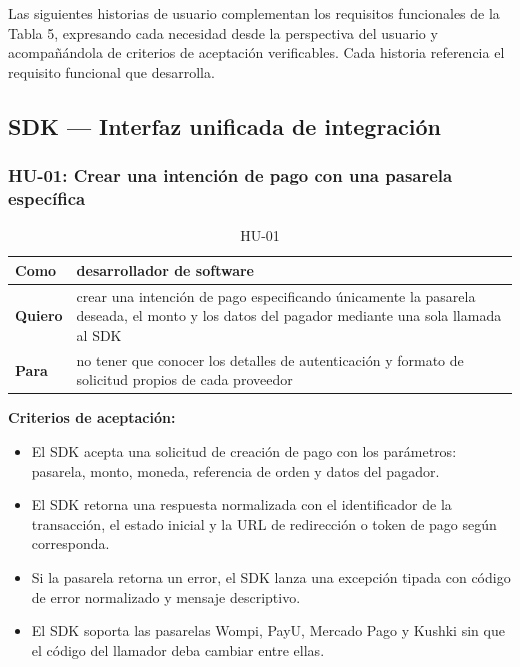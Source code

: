 \documentclass[10pt]{article}
\begin{document}
Las siguientes historias de usuario complementan los requisitos funcionales de la Tabla 5, expresando cada necesidad desde la perspectiva del usuario y acompañándola de criterios de aceptación verificables. Cada historia referencia el requisito funcional que desarrolla.

\subsection{SDK — Interfaz unificada de integración}

\subsubsection{HU-01: Crear una intención de pago con una pasarela específica}
\begin{table}[htbp]
  \centering
  \renewcommand{\arraystretch}{1.2}
  \begin{tabularx}{\textwidth}{|l|X|}
    \hline
    \textbf{Como} & desarrollador de software \\
    \hline
    \textbf{Quiero} & crear una intención de pago especificando únicamente la pasarela deseada, el monto y los datos del pagador mediante una sola llamada al SDK \\
    \hline
    \textbf{Para} & no tener que conocer los detalles de autenticación y formato de solicitud propios de cada proveedor \\
    \hline
  \end{tabularx}
  \caption{HU-01}
  \label{tab:hu-01}
\end{table}

\textbf{Criterios de aceptación:}
\begin{itemize}
  \item El SDK acepta una solicitud de creación de pago con los parámetros: pasarela, monto, moneda, referencia de orden y datos del pagador.
  \item El SDK retorna una respuesta normalizada con el identificador de la transacción, el estado inicial y la URL de redirección o token de pago según corresponda.
  \item Si la pasarela retorna un error, el SDK lanza una excepción tipada con código de error normalizado y mensaje descriptivo.
  \item El SDK soporta las pasarelas Wompi, PayU, Mercado Pago y Kushki sin que el código del llamador deba cambiar entre ellas.
\end{itemize}
\end{document}
